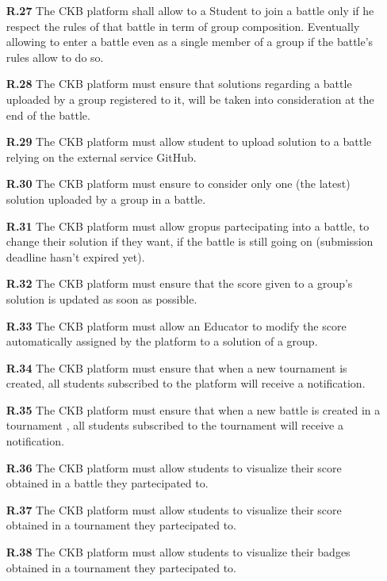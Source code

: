 \documentclass{article}
\begin{document}
{\begin{itemize}
            other students in order to form groups.
            \item[\textbf{R.27}] The CKB platform shall allow to a Student to join a battle only if he respect the 
            rules of that battle in term of group composition. Eventually allowing to enter a battle even as a single
            member of a group if the battle's rules allow to do so.
            \item[\textbf{R.28}] The CKB platform must ensure that solutions regarding a battle uploaded by a group
            registered to it, will be taken into consideration at the end of the battle.
            \item[\textbf{R.29}] The CKB platform must allow student to upload solution to a battle relying on the
            external service GitHub.
            \item[\textbf{R.30}] The CKB platform must ensure to consider only one (the latest) solution uploaded by
            a group in a battle.
            \item[\textbf{R.31}] The CKB platform must allow gropus partecipating into a battle, to change their solution
            if they want, if the battle is still going on (submission deadline hasn't expired yet).
            \item[\textbf{R.32}] The CKB platform must ensure that the score given to a group's solution is
            updated as soon as possible.
            \item[\textbf{R.33}] The CKB platform must allow an Educator to modify the score automatically
            assigned by the platform to a solution of a group.
            \item[\textbf{R.34}] The CKB platform must ensure that when a new tournament is created, all
            students subscribed to the platform will receive a notification.
            \item[\textbf{R.35}] The CKB platform must ensure that when a new battle is created in a tournament
            , all students subscribed to the tournament will receive a notification.
            \item[\textbf{R.36}] The CKB platform must allow students to visualize their score obtained in a battle they partecipated to.
            \item[\textbf{R.37}] The CKB platform must allow students to visualize their score obtained in a tournament they partecipated to.
            \item[\textbf{R.38}] The CKB platform must allow students to visualize their badges obtained in a tournament they partecipated to.  
        \end{itemize}
}
\end{document}
